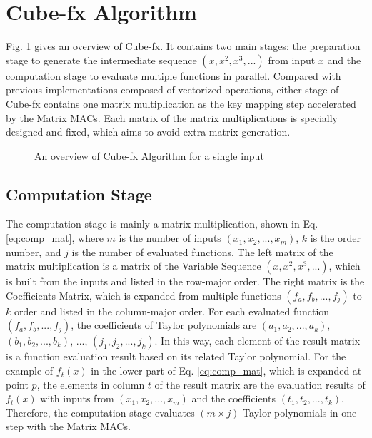\section{Cube-fx Algorithm \label{sec:3}}

Fig. \ref{fig:overview} gives an overview of Cube-fx. It contains two main stages: the preparation stage to generate the intermediate sequence $(x, x^2, x^3, ...)$ from input $x$ and the computation stage to evaluate multiple functions in parallel. Compared with previous implementations composed of vectorized operations, either stage of Cube-fx contains one matrix multiplication as the key mapping step accelerated by the Matrix MACs. Each matrix of the matrix multiplications is specially designed and fixed, which aims to avoid extra matrix generation. 

\begin{figure}[t]
    \caption{An overview of Cube-fx Algorithm for a single input}
    \label{fig:overview}
    \end{figure}

\subsection{Computation Stage}

The computation stage is mainly a matrix multiplication, shown in Eq. \ref{eq:comp_mat}, where $m$ is the number of inputs $(x_1, x_2, ..., x_m)$, $k$ is the order number, and $j$ is the number of evaluated functions. The left matrix of the matrix multiplication is a matrix of the Variable Sequence $(x, x^2, x^3, ...)$, which is built from the inputs and listed in the row-major order. The right matrix is the Coefficients Matrix, which is expanded from multiple functions $(f_a, f_b, ..., f_j)$ to $k$ order and listed in the column-major order. For each evaluated function $(f_a, f_b, ..., f_j)$, the coefficients of Taylor polynomials are $(a_1, a_2, ..., a_k)$, $(b_1, b_2, ..., b_k)$, $...$, $(j_1, j_2, ..., j_k)$. In this way, each element of the result matrix is a function evaluation result based on its related Taylor polynomial. For the example of $f_t(x)$ in the lower part of Eq. \ref{eq:comp_mat}, which is expanded at point $p$, the elements in column $t$ of the result matrix are the evaluation results of $f_t(x)$ with inputs from $(x_1, x_2, ..., x_m)$ and the coefficients $(t_1, t_2, ..., t_k)$. Therefore, the computation stage evaluates $(m \times j)$ Taylor polynomials in one step with the Matrix MACs.

